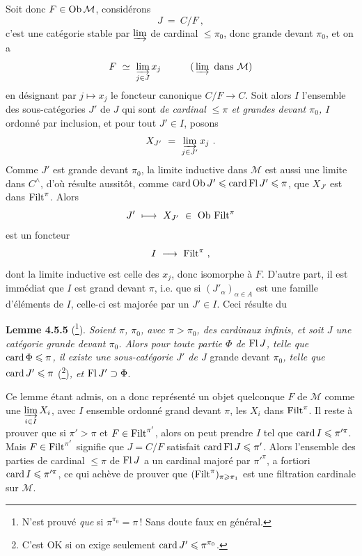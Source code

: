 Soit donc $F \in \mathrm{Ob}\,\mathcal{M}$, considérons
\[
J \ =\ C/F\ ,
\]
c'est une catégorie stable par $\varinjlim$ de cardinal $\leqslant \pi_0$, donc grande devant $\pi_0$, et on a
\[
F \ \simeq\ \varinjlim_{j\in J} x_j \qquad\quad (\,\varinjlim \ \text{dans } \mathcal{M})
\]
en désignant par $j \longmapsto x_j$ le foncteur canonique $C/F \longrightarrow C$. Soit alors $I$ l'ensemble des sous-catégories $J'$ de $J$ qui sont \textit{de cardinal $\leqslant \pi$ et grandes devant $\pi_0$, $I$} ordonné par inclusion, et pour tout $J' \in I$, posons
\[
X_{J'} \ =\ \varinjlim_{j\in J'} x_j\ .
\]
Comme $J'$ est grande devant $\pi_0$, la limite inductive dans $\mathcal{M}$ est aussi une limite dans $C^{\wedge}$, d'où résulte aussitôt, comme $\operatorname{card}\mathrm{Ob}\, J' \leqslant \operatorname{card}\operatorname{Fl} J' \leqslant \pi$, que $X_{J'}$ est dans $\operatorname{Filt}^{\pi}$. Alors
\[
J' \ \longmapsto\ X_{J'} \ \in\ \Ob\Filt^{\pi}
\]
est un foncteur
\[
I \ \longrightarrow\ \Filt^{\pi}\ ,
\]
dont la limite inductive est celle des $x_j$, donc isomorphe à $F$. D'autre part, il est immédiat que $I$ est grand devant $\pi$, i.e. que si $(J'_{\alpha})_{\alpha\in A}$ est
une famille d'éléments de $I$, celle-ci est majorée par un $J' \in I$. Ceci résulte du

\textbf{Lemme 4.5.5} (\footnote{N'est prouvé \textit{que} si $\pi^{\pi_0} = \pi$\,! Sans doute faux en général.}). \textit{Soient $\pi$, $\pi_0$, avec $\pi > \pi_0$, des cardinaux infinis, et soit $J$ une catégorie grande devant $\pi_0$. Alors pour toute partie $\Phi$ de} $\operatorname{Fl} J$\textit{, telle que} $\operatorname{card}\Phi \leqslant \pi$\textit{, il existe une sous-catégorie $J'$ de $J$} grande devant $\pi_0$\textit{, telle que} $\operatorname{card} J' \leqslant \pi$ (\footnote{C'est OK si on exige seulement $\operatorname{card} J' \leqslant \pi^{\pi_0}$.})\textit{, et} $\operatorname{Fl} J' \supset \Phi$.

Ce lemme étant admis, on a donc représenté un objet quelconque $F$ de $\mathcal{M}$ comme une $\varinjlim\limits_{i\in I} X_i$, avec $I$ ensemble ordonné grand devant $\pi$, les $X_i$ dans $\operatorname{Filt}^{\pi}$. Il reste à prouver que si $\pi' > \pi$ et $F \in \operatorname{Filt}^{\pi'}$, alors on peut prendre $I$ tel que $\operatorname{card} I \leqslant \pi'^{\pi}$. Mais $F \in \operatorname{Filt}^{\pi'}$ signifie que $J = C/F$ satisfait $\operatorname{card}\operatorname{Fl} J \leqslant \pi'$. Alors l'ensemble des parties de cardinal $\leqslant \pi$ de $\operatorname{Fl} J$ a un cardinal majoré par $\pi'^{\pi}$, a fortiori $\operatorname{card} I \leqslant \pi'^{\pi}$, ce qui achève de prouver que $(\operatorname{Filt}^{\pi})_{\pi\geqslant\pi_1}$ est une filtration cardinale sur $\mathcal{M}$.

